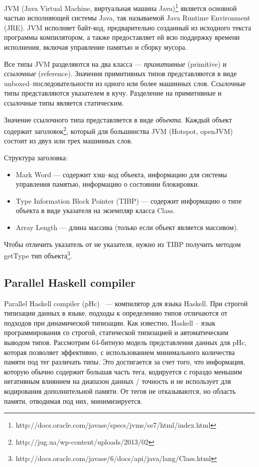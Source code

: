 JVM (Java Virtual Machine, виртуальная машина Java)\footnote{http://docs.oracle.com/javase/specs/jvms/se7/html/index.html}
является основной частью исполняющей системы Java, так называемой Java Runtime Environment (JRE).
JVM исполняет байт-код, предварительно созданный из исходного текста программы компилятором, а также
предоставляет ей всю поддержку времени исполнения, включая управление памятью и сборку мусора.

Все типы JVM разделяются на два класса --- \emph{примитивные} (primitive) и \emph{ссылочные} (reference).
Значения примитивных типов представляются в виде unboxed--последовательности из одного или более машинных слов.
Ссылочные типы представляются указателем в кучу. Разделение на примитивные и ссылочные типы является статическим.

Значение ссылочного типа представляется в виде \emph{объекта}.
Каждый объект содержит заголовок\footnote{http://jug.ua/wp-content/uploads/2013/02}, который для 
большинства JVM (Hotspot, openJVM) состоит из двух или трех машинных слов.

Структура заголовка:

\begin{itemize}
\item Mark Word --- содержит хэш--код объекта, информацию для системы управления памятью, информацию о состоянии блокировки. 
\item Type Information Block Pointer (TIBP) --- содержит информацию о типе объекта в виде указателя на экземпляр класса Class.
\item Array Length --- длина массива (только если объект является массивом).
\end{itemize}            

Чтобы отличить указатель от не указателя, нужно из TIBP получить методом getType тип объекта\footnote{http://docs.oracle.com/javase/6/docs/api/java/lang/Class.html}.

\subsection {Parallel Haskell compiler}

Parallel Haskell compiler (pHc)~\cite{pHc} — компилятор для языка Haskell.
При строгой типизации данных в языке, подходы к определению типов отличаются от подходов при динамической типизации.
Как известно, Haskell -- язык программирования со строгой, статической типизацией и автоматическим выводом типов.
Рассмотрим 64-битную модель представления данных для pHc, которая позволяет эффективно, с использованием минимального количества памяти под тег различать типы.
Это достигается за счет того, что информация, которую обычно содержит большая часть тега, кодируется с гораздо меньшим негативным влиянием на диапазон данных / точность и не использует для кодирования дополнительной памяти.
От тегов не отказываются, но область памяти, отводимая под них, минимизируется.

